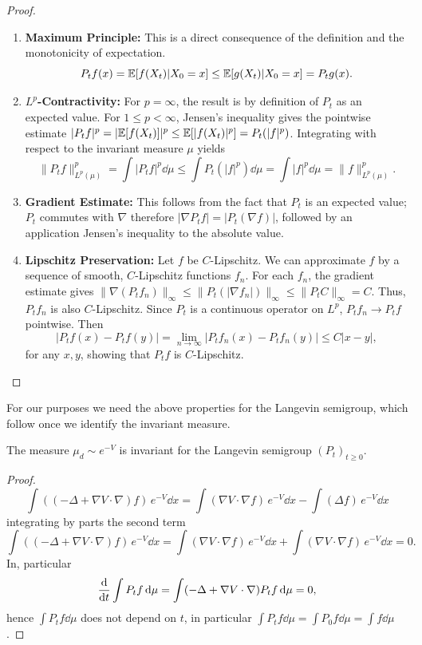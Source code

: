\begin{proof} \,
\begin{enumerate}
\item \textbf{Maximum Principle:} This is a direct consequence of the definition and the monotonicity of expectation.
    \[ P_t f(x) = \mathbb{E}[f(X_t) | X_0 = x] \le \mathbb{E}[g(X_t) | X_0 = x] = P_t g(x). \]

\item \textbf{$L^p$-Contractivity:} For $p=\infty$, the result is by definition of $P_t$ as an expected value. For $1 \le p < \infty$, Jensen's inequality gives the pointwise estimate $|P_t f|^p = |\mathbb{E}[f(X_t)]|^p \le \mathbb{E}[|f(X_t)|^p] = P_t(|f|^p)$. Integrating with respect to the invariant measure $\mu$ yields
    \[
        \|P_t f\|_{L^p(\mu)}^p
        = \int |P_t f|^p \dd{\mu}
        \le \int P_t(|f|^p) \dd{\mu}
        = \int |f|^p \dd{\mu}
        = \|f\|_{L^p(\mu)}^p.
    \]

 \item \textbf{Gradient Estimate:} This follows from the fact that $P_t$ is an expected value; $P_t$ commutes with $\nabla$ therefore $|\nabla P_t f| = |P_t(\nabla f)|$, followed by an application Jensen's inequality to the absolute value.

\item \textbf{Lipschitz Preservation:} Let $f$ be $C$-Lipschitz. We can approximate $f$ by a sequence of smooth, $C$-Lipschitz functions $f_n$. For each $f_n$, the gradient estimate gives $\|\nabla (P_t f_n)\|_\infty \le \|P_t(|\nabla f_n|)\|_\infty \le \|P_t C\|_\infty = C$. Thus, $P_t f_n$ is also $C$-Lipschitz. Since $P_t$ is a continuous operator on $L^p$, $P_t f_n \to P_t f$ pointwise. Then \[ |P_t f(x) - P_t f(y)| = \lim_{n\to\infty} |P_t f_n(x) - P_t f_n(y)| \le C|x-y|, \] for any $x,y$, showing that $P_t f$ is $C$-Lipschitz.
\end{enumerate}
\end{proof}

For our purposes we need the above properties for the Langevin semigroup, which follow once we identify the invariant measure.

\begin{lemma} \label{lem:measure_is_invariant}
    The measure \( \mu_d \sim e^{-V} \) is invariant for the Langevin semigroup \( (P_t)_{t \ge 0} \).
\end{lemma}
\begin{proof}
    $$
    \int ((-\Delta + \nabla V \cdot \nabla) f) \, e^{-V} \dd{x}
    = \int (\nabla V \cdot \nabla f) \, e^{-V} \dd{x} - \int (\Delta f) \, e^{-V} \dd{x}
    $$
    integrating by parts the second term
    $$
    \int ((-\Delta + \nabla V \cdot \nabla) f) \, e^{-V} \dd{x} = \int (\nabla V \cdot \nabla f) \, e^{-V} \dd{x} + \int (\nabla V \cdot \nabla f) \, e^{-V} \dd{x} = 0.
    $$
    In, particular
    \[
        \dv{t} \int P_t f \dd{\mu}
        = \int (-\Delta + \nabla V \cdot \nabla) P_t f \dd{\mu}
        = 0,
    \]
    hence $\int P_t f \dd{\mu}$ does not depend on $t$, in particular $\int P_t f \dd{\mu} = \int P_0 f \dd{\mu} = \int f \dd{\mu}$.
\end{proof}

